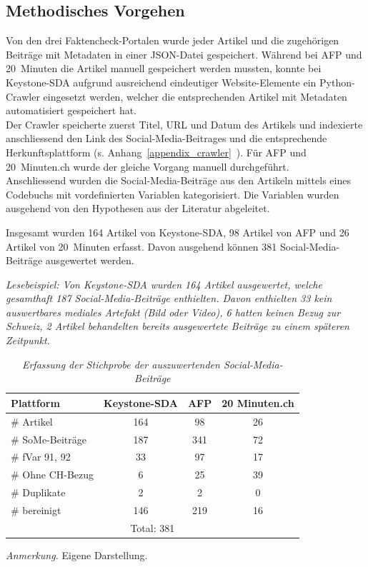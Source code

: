 \documentclass[12pt,a4paper]{article}        %
\begin{document}
\subsection{Methodisches Vorgehen}
Von den drei Faktencheck-Portalen wurde jeder Artikel und die zugehörigen Beiträge mit Metadaten in einer JSON-Datei gespeichert. Während bei AFP und 20 Minuten die Artikel manuell gespeichert werden mussten, konnte bei Keystone-SDA aufgrund ausreichend eindeutiger Website-Elemente ein Python-Crawler eingesetzt werden, welcher die entsprechenden Artikel mit Metadaten automatisiert gespeichert hat.\\
Der Crawler speicherte zuerst Titel, URL und Datum des Artikels und indexierte anschliessend den Link des Social-Media-Beitrages und die entsprechende Herkunftsplattform (s. Anhang~\ref{appendix_crawler}~). Für AFP und 20 Minuten.ch wurde der gleiche Vorgang manuell durchgeführt.\\
Anschliessend wurden die Social-Media-Beiträge aus den Artikeln mittels eines Codebuchs mit vordefinierten Variablen kategorisiert. Die Variablen wurden ausgehend von den Hypothesen aus der Literatur abgeleitet.

Insgesamt wurden 164 Artikel von Keystone-SDA, 98 Artikel von AFP und 26 Artikel von 20 Minuten erfasst. Davon ausgehend können 381 Social-Media-Beiträge ausgewertet werden.

\begin{table}[H]
  \caption{\textit{Erfassung der Stichprobe der auszuwertenden Social-Media-Beiträge}}

  \textit{Lesebeispiel: Von Keystone-SDA wurden 164 Artikel ausgewertet, welche gesamthaft 187 Social-Media-Beiträge enthielten. Davon enthielten 33 kein auswertbares mediales Artefakt (Bild oder Video), 6 hatten keinen Bezug zur Schweiz, 2 Artikel behandelten bereits ausgewertete Beiträge zu einem späteren Zeitpunkt.}
  \label{tab:method_sample}
  \centering
  \begin{tabular}{|l|c|c|c|}
    \hline
    \textbf{Plattform} & \textbf{Keystone-SDA} & \textbf{AFP} & \textbf{20 Minuten.ch} \\
    \hline
    \# Artikel & 164 & 98 & 26 \\
    \hline
    \# SoMe-Beiträge & 187 & 341 & 72 \\
    \hline
    \# fVar 91, 92 & 33 & 97 & 17 \\
    \hline
    \# Ohne CH-Bezug & 6 & 25 & 39 \\
    \hline
    \# Duplikate & 2 & 2 & 0 \\
    \hline
    \# bereinigt & 146 & 219 & 16 \\
    \hline
    \multicolumn{4}{|c|}{Total: 381} \\
    \hline
  \end{tabular}

  \footnotesize\textit{Anmerkung.} Eigene Darstellung.
\end{table}
\end{document}
